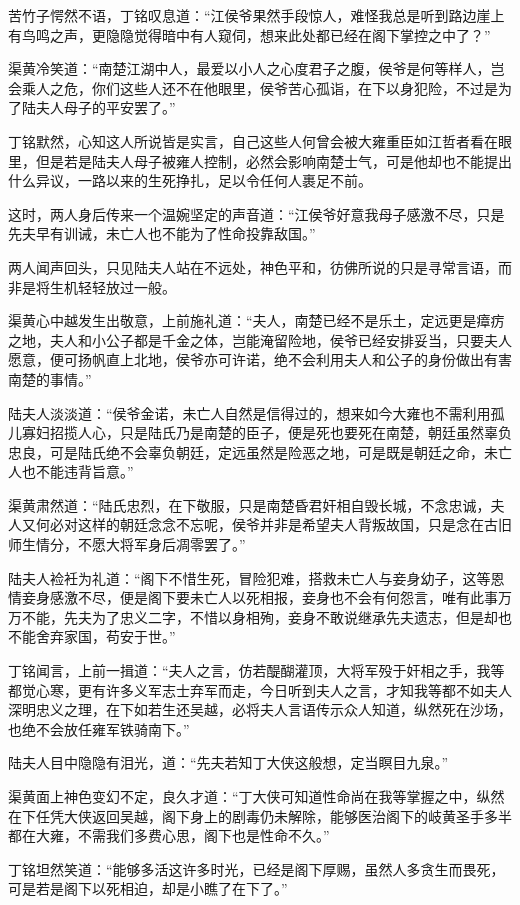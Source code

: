 苦竹子愕然不语，丁铭叹息道：“江侯爷果然手段惊人，难怪我总是听到路边崖上有鸟鸣之声，更隐隐觉得暗中有人窥伺，想来此处都已经在阁下掌控之中了？”

渠黄冷笑道：“南楚江湖中人，最爱以小人之心度君子之腹，侯爷是何等样人，岂会乘人之危，你们这些人还不在他眼里，侯爷苦心孤诣，在下以身犯险，不过是为了陆夫人母子的平安罢了。”

丁铭默然，心知这人所说皆是实言，自己这些人何曾会被大雍重臣如江哲者看在眼里，但是若是陆夫人母子被雍人控制，必然会影响南楚士气，可是他却也不能提出什么异议，一路以来的生死挣扎，足以令任何人裹足不前。

这时，两人身后传来一个温婉坚定的声音道：“江侯爷好意我母子感激不尽，只是先夫早有训诫，未亡人也不能为了性命投靠敌国。”

两人闻声回头，只见陆夫人站在不远处，神色平和，彷佛所说的只是寻常言语，而非是将生机轻轻放过一般。

渠黄心中越发生出敬意，上前施礼道：“夫人，南楚已经不是乐土，定远更是瘴疠之地，夫人和小公子都是千金之体，岂能淹留险地，侯爷已经安排妥当，只要夫人愿意，便可扬帆直上北地，侯爷亦可许诺，绝不会利用夫人和公子的身份做出有害南楚的事情。”

陆夫人淡淡道：“侯爷金诺，未亡人自然是信得过的，想来如今大雍也不需利用孤儿寡妇招揽人心，只是陆氏乃是南楚的臣子，便是死也要死在南楚，朝廷虽然辜负忠良，可是陆氏绝不会辜负朝廷，定远虽然是险恶之地，可是既是朝廷之命，未亡人也不能违背旨意。”

渠黄肃然道：“陆氏忠烈，在下敬服，只是南楚昏君奸相自毁长城，不念忠诚，夫人又何必对这样的朝廷念念不忘呢，侯爷并非是希望夫人背叛故国，只是念在古旧师生情分，不愿大将军身后凋零罢了。”

陆夫人裣衽为礼道：“阁下不惜生死，冒险犯难，搭救未亡人与妾身幼子，这等恩情妾身感激不尽，便是阁下要未亡人以死相报，妾身也不会有何怨言，唯有此事万万不能，先夫为了忠义二字，不惜以身相殉，妾身不敢说继承先夫遗志，但是却也不能舍弃家国，苟安于世。”

丁铭闻言，上前一揖道：“夫人之言，仿若醍醐灌顶，大将军殁于奸相之手，我等都觉心寒，更有许多义军志士弃军而走，今日听到夫人之言，才知我等都不如夫人深明忠义之理，在下如若生还吴越，必将夫人言语传示众人知道，纵然死在沙场，也绝不会放任雍军铁骑南下。”

陆夫人目中隐隐有泪光，道：“先夫若知丁大侠这般想，定当瞑目九泉。”

渠黄面上神色变幻不定，良久才道：“丁大侠可知道性命尚在我等掌握之中，纵然在下任凭大侠返回吴越，阁下身上的剧毒仍未解除，能够医治阁下的岐黄圣手多半都在大雍，不需我们多费心思，阁下也是性命不久。”

丁铭坦然笑道：“能够多活这许多时光，已经是阁下厚赐，虽然人多贪生而畏死，可是若是阁下以死相迫，却是小瞧了在下了。”

